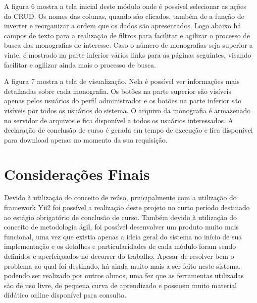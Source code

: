 \documentclass[
	12pt,				%
	openright,			%
	twoside,			%
	a4paper,			%
	english,			%
	french,				%
	spanish,			%
	brazil,				%
	]{abntex2}
\begin{document}
A figura 6 mostra a tela inicial deste módulo onde é possível selecionar as ações do CRUD. Os nomes das colunas, quando são clicados, também de a função de inverter e reorganizar a ordem que os dados são apresentados. Logo abaixo há campos de texto para a realização de filtros para facilitar e agilizar o processo de busca das monografias de interesse. Caso o número de monografias seja superior a vinte, é mostrado na parte inferior vários links para as páginas seguintes, visando facilitar e agilizar ainda mais o processo de busca.

A figura 7 mostra a tela de visualização. Nela é possível ver informações mais detalhadas sobre cada monografia. Os botões na parte superior são visíveis apenas pelos usuários do perfil administrador e os botões na parte inferior são visíveis por todos os usuários do sistema. O arquivo da monografia é armazenado no servidor de arquivos e fica disponível a todos os usuários interessados. A declaração de conclusão de curso é gerada em tempo de execução e fica disponível para download apenas no momento da sua requisição.


\chapter{Considerações Finais}

Devido à utilização do conceito de reúso, principalmente com a utilização do framework Yii2 foi possível a realização deste projeto no curto período destinado ao estágio obrigatório de conclusão de curso. Também devido à utilização do conceito de metodologia ágil, foi possível desenvolver um produto muito mais funcional, uma vez que existia apenas a ideia geral do sistema no início de sua implementação e os detalhes e particularidades de cada módulo foram sendo definidos e aperfeiçoados no decorrer do trabalho. Apesar de resolver bem o problema ao qual foi destinado, há ainda muito mais a ser feito neste sistema, podendo ser realizado por outros alunos, uma fez que as ferramentas utilizadas são de uso livre, de pequena curva de aprendizado e possuem muito material didático online disponível para consulta.
\end{document}
